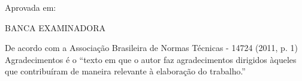 \documentclass[
        12pt,
        openany, %
        oneside, %
        a4paper,
        english,
        brazil			        %
        ]{abntbibufjf}
\begin{document}

\inserecapa

\inserefolhaderosto


\inserecatalog


\begin{folhadeaprovacao}

  \begin{center}
    {\chapterfont \bfseries \insereautor}

    \vfill
    \begin{center}
      {\chapterfont\bfseries\inseretitulo \inseresubtitulo}
    \end{center}
    \vfill

    \hspace{.45\textwidth}
    \begin{minipage}{.5\textwidth}
        \inserenatureza
    \end{minipage}%
    \vfill
   \end{center}

   Aprovada em: %

   \begin{center} BANCA EXAMINADORA \end{center}
\end{folhadeaprovacao}




\begin{agradecimentos}

De acordo com a Associa\c{c}\~ao Brasileira de Normas T\'ecnicas - 14724 (2011, p. 1) Agradecimentos
\'e o ``texto em que o autor faz agradecimentos dirigidos \`aqueles que contribu\'iram de maneira relevante \`a elabora\c{c}\~ao do trabalho.''

\end{agradecimentos}
\end{document}
